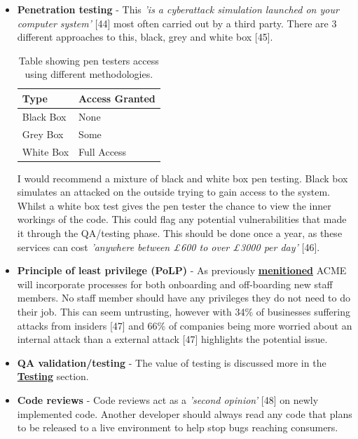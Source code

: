   \begin{itemize}
    \item \textbf{Penetration testing} - This \textit{'is a cyberattack simulation launched on your computer system'} [44] most often carried out by a
    third party. There are 3 different approaches to this, black, grey and white box [45].

    \begin{table}[H]
      \centering
      \begin{tabular}{|l|l|}
        \hline
        \textbf{Type} & \textbf{Access Granted}   \\ \hline
        Black Box     & None                      \\ \hline
        Grey Box      & Some                      \\ \hline
        White Box     & Full Access               \\ \hline
      \end{tabular}
      \caption{Table showing pen testers access using different methodologies.}
    \end{table}

    I would recommend a mixture of black and white box pen testing. Black box simulates an attacked on the outside trying to gain access to the system.
    Whilst a white box test gives the pen tester the chance to view the inner workings of the code. This could flag any potential vulnerabilities that 
    made it through the QA/testing phase. This should be done once a year, as these services can cost 
    \textit{'anywhere between £600 to over £3000 per day'} [46].

    \item \textbf{Principle of least privilege (PoLP)} - As previously \hyperref[sec:PoLP]{\textbf{menitioned}} ACME will incorporate processes for 
    both onboarding and off-boarding new staff members. No staff member should have any privileges they do not need to do their job. This can seem 
    untrusting, however with 34\% of businesses suffering attacks from insiders [47] and 66\% of companies being more worried about an internal attack 
    than a external attack [47] highlights the potential issue.

    \item \textbf{QA validation/testing} - The value of testing is discussed more in the \hyperref[sec:Testing]{\textbf{Testing}} section.
    
    \item \textbf{Code reviews} - Code reviews act as a \textit{'second opinion'} [48] on newly implemented code. Another developer should always read any 
    code that plans to be released to a live environment to help stop bugs reaching consumers.


\end{itemize}
